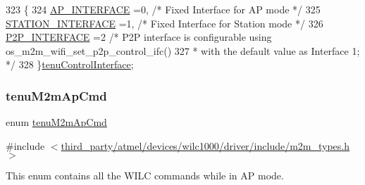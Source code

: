 \begin{DoxyCode}
323              \{
324     \hyperlink{group__WlanEnums_gga21dc8518e48f99cdf9cf68eebcfcf982aeef78d0be1ab7a519e48d25a2eea8717}{AP\_INTERFACE}    =0,     \textcolor{comment}{/* Fixed Interface for AP mode              */}
325     \hyperlink{group__WlanEnums_gga21dc8518e48f99cdf9cf68eebcfcf982af1332c69b03c8077d76b6652e4b6b67d}{STATION\_INTERFACE} =1,  \textcolor{comment}{/* Fixed Interface for Station mode         */}
326     \hyperlink{group__WlanEnums_gga21dc8518e48f99cdf9cf68eebcfcf982a3a2237e45eb871715b30ac94c105b4a2}{P2P\_INTERFACE}  =2      \textcolor{comment}{/* P2P interface is configurable using
       os\_m2m\_wifi\_set\_p2p\_control\_ifc()}
327 \textcolor{comment}{                             * with the default value as Interface 1;   */}
328 \}\hyperlink{group__WlanEnums_ga21dc8518e48f99cdf9cf68eebcfcf982}{tenuControlInterface};
\end{DoxyCode}
\mbox{\label{group__WlanEnums_gaa62989ea5e2977b374a04db81c89d524}} 
\subsubsection{\texorpdfstring{tenu\+M2m\+Ap\+Cmd}{tenuM2mApCmd}}
{\footnotesize\ttfamily enum \hyperlink{group__WlanEnums_gaa62989ea5e2977b374a04db81c89d524}{tenu\+M2m\+Ap\+Cmd}}



{\ttfamily \#include $<$\hyperlink{m2m__types_8h}{third\+\_\+party/atmel/devices/wilc1000/driver/include/m2m\+\_\+types.\+h}$>$}



This enum contains all the W\+I\+LC commands while in AP mode. 

